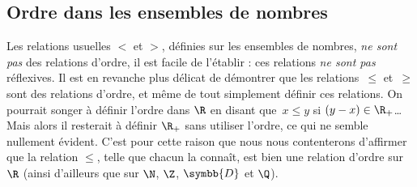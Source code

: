 
\subsection{Ordre dans les ensembles de nombres}
Les relations usuelles $<$ et $>$, définies sur les ensembles de nombres, \emph{ne sont pas} des relations d'ordre, il est facile de l'établir : ces relations \emph{ne sont pas} réflexives. Il est en revanche plus délicat de démontrer que les relations~$\leq$ et~$\geq$ sont des relations d'ordre, et même de tout simplement définir ces relations.
 On pourrait songer à définir l'ordre dans $\R$ en disant que~$x\leq y$ si $(y-x)\in \R_{+}$… Mais alors il resterait à définir $\R_{+}$ sans utiliser l'ordre, ce qui ne semble nullement évident. C'est pour cette raison que nous nous contenterons d'affirmer que la relation $\leq$, telle que chacun la connaît, est bien une relation d'ordre sur $\R$ (ainsi d'ailleurs que sur $\N$, $\Z$, $\symbb{D}$ et $\Q$).
 
